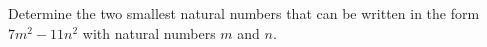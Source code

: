Determine the two smallest natural numbers that can be written
in the form $7m^2-11n^2$ with natural numbers $m$ and $n$.